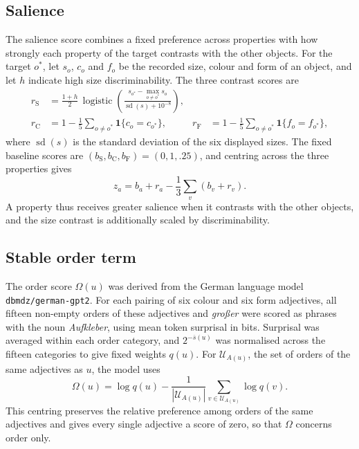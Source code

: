 \documentclass[10pt,a4paper,fleqn]{article}
\begin{document}
\subsection{Salience}

The salience score combines a fixed preference across properties with how strongly each property of the target contrasts with the other objects.
For the target $o^*$, let $s_o$, $c_o$ and $f_o$ be the recorded size, colour and form of an object, and let $h$ indicate high size discriminability.
The three contrast scores are
\begin{align}
 r_{\mathrm S}&=\frac{1+h}{2}\,
 \operatorname{logistic}\!\left(
 \frac{s_{o^*}-\max_{o\ne o^*}s_o}{\operatorname{sd}(s)+10^{-8}}
 \right),\\
 r_{\mathrm C}&=1-\frac{1}{5}\sum_{o\ne o^*}\mathbf 1\{c_o=c_{o^*}\},
 &r_{\mathrm F}&=1-\frac{1}{5}\sum_{o\ne o^*}\mathbf 1\{f_o=f_{o^*}\},
\end{align}
where $\operatorname{sd}(s)$ is the standard deviation of the six displayed sizes.
The fixed baseline scores are $(b_{\mathrm S},b_{\mathrm C},b_{\mathrm F})=(0,1,.25)$, and centring across the three properties gives
\[
 z_a=b_a+r_a-\frac13\sum_v(b_v+r_v).
\]
A property thus receives greater salience when it contrasts with the other objects, and the size contrast is additionally scaled by discriminability.

\subsection{Stable order term}

The order score $\Omega(u)$ was derived from the German language model \texttt{dbmdz/german-gpt2}.
For each pairing of six colour and six form adjectives, all fifteen non-empty orders of these adjectives and \emph{gro{\ss}er} were scored as phrases with the noun \emph{Aufkleber}, using mean token surprisal in bits.
Surprisal was averaged within each order category, and $2^{-\overline{s}(u)}$ was normalised across the fifteen categories to give fixed weights $q(u)$.
For $\mathcal U_{A(u)}$, the set of orders of the same adjectives as $u$, the model uses
\begin{equation}
 \Omega(u)=\log q(u)-\frac{1}{|\mathcal U_{A(u)}|}
 \sum_{v\in\mathcal U_{A(u)}}\log q(v).
 \label{eq:order-residual}
\end{equation}
This centring preserves the relative preference among orders of the same adjectives and gives every single adjective a score of zero, so that $\Omega$ concerns order only.
\end{document}
